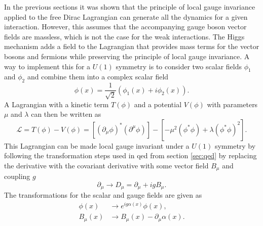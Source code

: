 In the previous sections it was shown that the principle of local gauge invariance applied to the free Dirac Lagrangian can generate all the dynamics for a given interaction. However, this assumes that the accompanying gauge boson vector fields are massless, which is not the case for the weak interactions. The Higgs mechanism adds a field to the Lagrangian that provides mass terms for the vector bosons and fermions while preserving the principle of local gauge invariance. A way to implement this for a $U(1)$ symmetry is to consider two scalar fields $\phi_1$ and $\phi_2$ and combine them into a complex scalar field
\begin{equation}
    \phi (x)=\frac{1}{\sqrt{2}}(\phi_1(x)+i\phi_2(x)).
\end{equation}
A Lagrangian with a kinetic term $T(\phi)$ and a potential $V(\phi)$ with parameters $\mu$ and $\lambda$ can then be written as
\begin{equation}
    \mathcal{L}=T(\phi)-V(\phi)=
    \left[\left(\partial_\mu\phi\right)^* (\partial^\mu\phi)\right]
    -\left[
        -\mu^2(\phi^*\phi)+\lambda(\phi^*\phi)^2
        \right].
\end{equation}
This Lagrangian can be made local gauge invariant under a $U(1)$ symmetry by following the transformation steps used in \ac{qed} from section \ref{sec:qed} by replacing the derivative with the covariant derivative with some vector field $B_\mu$ and coupling $g$
\begin{equation}
    \partial_\mu \rightarrow D_\mu = \partial_\mu + ig B_\mu.
\end{equation}
The transformations for the scalar and gauge fields are given as
\begin{align}
    \phi(x)  & \rightarrow  e^{i g\alpha(x)}\phi(x), \label{eq:scalar_local_gauge} \\
    B_\mu(x) & \xrightarrow{} B_\mu(x) -\partial_\mu\alpha(x).
\end{align}
